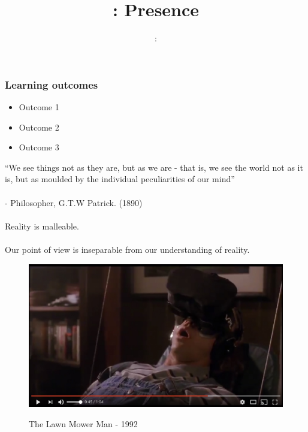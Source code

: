 \usepackage{../../beamerthemeFalmouthGamesAcademy}
\usepackage{multimedia}
\graphicspath{ {../../} }


\usepackage[normalem]{ulem}
\usepackage{wasysym}

\usepackage{pdfpages}

\usetikzlibrary{arrows,automata}




\title{\sessionnumber: Presence}
\subtitle{\modulecode: \moduletitle}

\frame{\titlepage} 

\begin{frame}
	\frametitle{Learning outcomes}
	\begin{itemize}
		\item Outcome 1
		\item Outcome 2
		\item Outcome 3
	\end{itemize}
\end{frame}

\begin{frame}
	``We see things not as they are, but as we are - that is, we see the world not as it is, but as moulded by the individual peculiarities of our mind'' \\~\\ - Philosopher, G.T.W Patrick. (1890) \\~\\
	\pause
	Reality is malleable. \\~\\ 
	\pause
	Our point of view is inseparable from our understanding of reality. 	
	
\end{frame}

\begin{frame}
	\begin{figure}
		\href{https://www.youtube.com/watch?v=gvozcv8pS3c}{ \includegraphics[scale=.3]{assets/mower}  }
		\caption{The Lawn Mower Man - 1992}
	\end{figure}
\end{frame}

